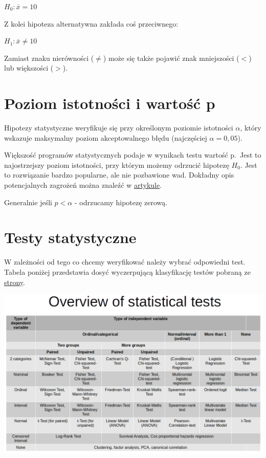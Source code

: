 \documentclass[]{book}
\begin{document}
\(H_0: \bar{x}=10\)

Z kolei hipoteza alternatywna zakłada coś przeciwnego:

\(H_1: \bar{x}\neq 10\)

Zamiast znaku nierówności (\(\neq\)) może się także pojawić znak mniejszości (\(<\)) lub większości (\(>\)).

\hypertarget{poziom-istotnosci-i-wartosc-p}{%
\section{Poziom istotności i wartość p}\label{poziom-istotnosci-i-wartosc-p}}

Hipotezy statystyczne weryfikuje się przy określonym poziomie istotności \(\alpha\), który wskazuje maksymalny poziom akceptowalnego błędu (najczęściej \(\alpha=0,05\)).

Większość programów statystycznych podaje w wynikach testu wartość p.~Jest to najostrzejszy poziom istotności, przy którym możemy odrzucić hipotezę \(H_0\). Jest to rozwiązanie bardzo popularne, ale nie pozbawione wad. Dokładny opis potencjalnych zagrożeń można znaleźć w \href{http://cejsh.icm.edu.pl/cejsh/element/bwmeta1.element.cejsh-e3daa053-7cf2-4eee-9192-16c48c3a7a45/c/05.pdf}{artykule}.

Generalnie jeśli \(p < \alpha\) - odrzucamy hipotezę zerową.

\hypertarget{testy-statystyczne}{%
\section{Testy statystyczne}\label{testy-statystyczne}}

W zależności od tego co chcemy weryfikować należy wybrać odpowiedni test. Tabela poniżej przedstawia dosyć wyczerpującą klasyfikację testów pobraną ze \href{https://philipppro.github.io/Statistical_tests_overview/}{strony}.

\includegraphics{img/tests.png}
\end{document}
